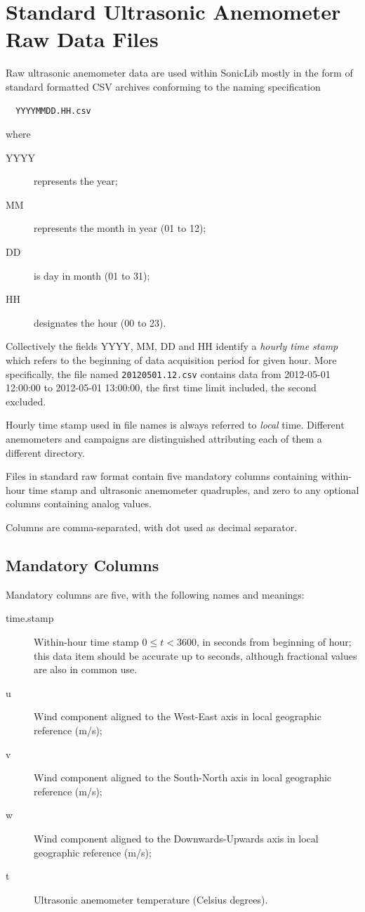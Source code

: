 \documentclass[a4paper,10pt]{book}
\begin{document}
\section{Standard Ultrasonic Anemometer Raw Data Files}
\label{sec:FileFormat}

Raw ultrasonic anemometer data are used within SonicLib mostly in the form of standard formatted CSV archives conforming to the naming specification

\begin{verbatim}
  YYYYMMDD.HH.csv
\end{verbatim}

\noindent where

\begin{description}
 \item[YYYY] represents the year;
 \item[MM] represents the month in year (01 to 12);
 \item[DD] is day in month (01 to 31);
 \item[HH] designates the hour (00 to 23).
\end{description}

Collectively the fields YYYY, MM, DD and HH identify a \emph{hourly time stamp} which refers to the beginning of data acquisition period for given hour. More specifically, the file named \texttt{20120501.12.csv} contains data from 2012-05-01 12:00:00 to 2012-05-01 13:00:00, the first time limit included, the second excluded.

Hourly time stamp used in file names is always referred to \emph{local} time. Different anemometers and campaigns are distinguished attributing each of them a different directory.

Files in standard raw format contain five mandatory columns containing within-hour time stamp and ultrasonic anemometer quadruples, and zero to any optional columns containing analog values.

Columns are comma-separated, with dot used as decimal separator.

\subsection{Mandatory Columns}
\label{sec:MandatoryColumns}

Mandatory columns are five, with the following names and meanings:
\begin{description}
 \item[time.stamp] Within-hour time stamp $0 \le t < 3600$, in seconds from beginning of hour; this data item should be accurate up to seconds, although fractional values are also in common use.
 \item[u] Wind component aligned to the West-East axis in local geographic reference (m/s); 
 \item[v] Wind component aligned to the South-North axis in local geographic reference (m/s); 
 \item[w] Wind component aligned to the Downwards-Upwards axis in local geographic reference (m/s); 
 \item[t] Ultrasonic anemometer temperature (Celsius degrees).
\end{description}
\end{document}
